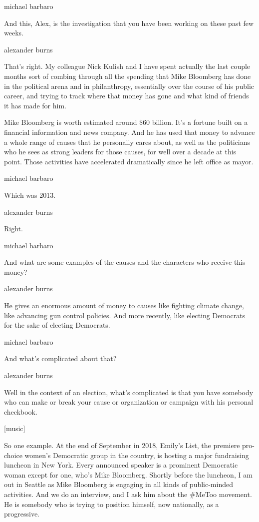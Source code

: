 michael barbaro

And this, Alex, is the investigation that you have been working on these
past few weeks.

alexander burns

That's right. My colleague Nick Kulish and I have spent actually the
last couple months sort of combing through all the spending that Mike
Bloomberg has done in the political arena and in philanthropy,
essentially over the course of his public career, and trying to track
where that money has gone and what kind of friends it has made for him.

Mike Bloomberg is worth estimated around \$60 billion. It's a fortune
built on a financial information and news company. And he has used that
money to advance a whole range of causes that he personally cares about,
as well as the politicians who he sees as strong leaders for those
causes, for well over a decade at this point. Those activities have
accelerated dramatically since he left office as mayor.

michael barbaro

Which was 2013.

alexander burns

Right.

michael barbaro

And what are some examples of the causes and the characters who receive
this money?

alexander burns

He gives an enormous amount of money to causes like fighting climate
change, like advancing gun control policies. And more recently, like
electing Democrats for the sake of electing Democrats.

michael barbaro

And what's complicated about that?

alexander burns

Well in the context of an election, what's complicated is that you have
somebody who can make or break your cause or organization or campaign
with his personal checkbook.

{[}music{]}

So one example. At the end of September in 2018, Emily's List, the
premiere pro-choice women's Democratic group in the country, is hosting
a major fundraising luncheon in New York. Every announced speaker is a
prominent Democratic woman except for one, who's Mike Bloomberg. Shortly
before the luncheon, I am out in Seattle as Mike Bloomberg is engaging
in all kinds of public-minded activities. And we do an interview, and I
ask him about the \#MeToo movement. He is somebody who is trying to
position himself, now nationally, as a progressive.

